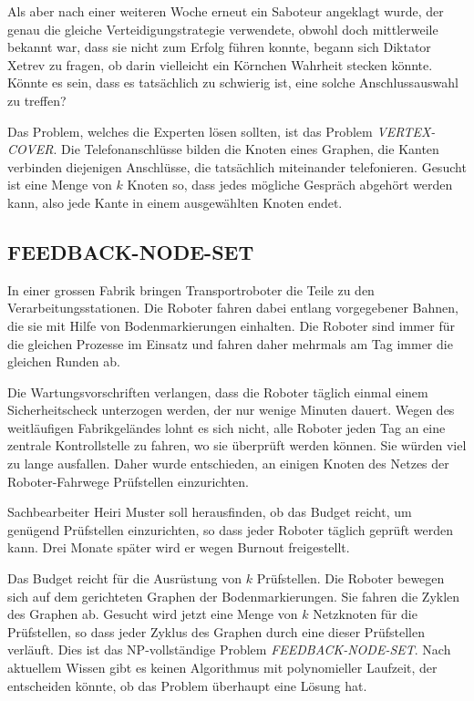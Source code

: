 Als aber nach einer weiteren Woche erneut ein Saboteur angeklagt wurde,
der genau die gleiche Verteidigungstrategie verwendete, obwohl
doch mittlerweile bekannt war, dass sie nicht zum Erfolg führen konnte,
begann sich Diktator Xetrev zu fragen, ob darin vielleicht
ein Körnchen Wahrheit stecken könnte. Könnte es sein, dass 
es tatsächlich zu schwierig ist, eine solche Anschlussauswahl zu treffen?

\medskip

Das Problem, welches die Experten lösen sollten, ist das Problem
{\it VERTEX-COVER}. Die Telefonanschlüsse bilden die Knoten eines Graphen,
die Kanten verbinden diejenigen Anschlüsse, die tatsächlich miteinander
telefonieren. Gesucht ist eine Menge von $k$ Knoten so, dass jedes
mögliche Gespräch abgehört werden kann, also jede Kante in einem
ausgewählten Knoten endet.


\subsection{FEEDBACK-NODE-SET}
In einer grossen Fabrik bringen Transportroboter die Teile zu den
Verarbeitungsstationen.  Die Roboter fahren dabei entlang vorgegebener
Bahnen, die sie mit Hilfe von Bodenmarkierungen einhalten.  Die Roboter
sind immer für die gleichen Prozesse im Einsatz und fahren daher mehrmals
am Tag immer die gleichen Runden ab.

Die Wartungsvorschriften verlangen, dass die Roboter täglich einmal einem
Sicherheitscheck unterzogen werden, der nur wenige Minuten dauert. Wegen
des weitläufigen Fabrikgeländes lohnt es sich nicht, alle Roboter jeden
Tag an eine zentrale Kontrollstelle zu fahren, wo sie überprüft werden
können. Sie würden viel zu lange ausfallen. Daher wurde entschieden, an
einigen Knoten des Netzes der Roboter-Fahrwege Prüfstellen einzurichten.

Sachbearbeiter Heiri Muster soll herausfinden, ob das Budget reicht,
um genügend Prüfstellen einzurichten, so dass jeder Roboter täglich
geprüft werden kann.
Drei Monate später wird er wegen Burnout freigestellt.

\medskip

Das Budget reicht für die Ausrüstung von $k$ Prüfstellen.
Die Roboter bewegen sich auf dem gerichteten Graphen der Bodenmarkierungen.
Sie fahren die Zyklen des Graphen ab. Gesucht wird jetzt eine Menge
von $k$ Netzknoten für die Prüfstellen, so dass jeder Zyklus des Graphen
durch eine dieser Prüfstellen verläuft.
Dies ist das NP-vollständige Problem {\it FEEDBACK-NODE-SET}.
Nach aktuellem Wissen gibt es keinen Algorithmus mit polynomieller
Laufzeit, der entscheiden könnte, ob das Problem überhaupt eine
Lösung hat.

